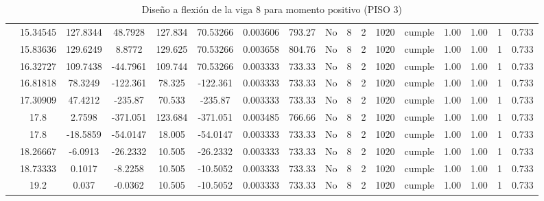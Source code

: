 \begin{table}[H]
{\begin{tabular}{|c|c|c|c|c|c|c|c|c|c|c|c|c|c|c|c|c|}
\cline{2-17}        & 15.34545 & 127.8344 & 48.7928 & 127.834 & 70.53266 & 0.003606 & 793.27 & No  & 8   & 2   & 1020 & \cellcolor[rgb]{ .776,  .937,  .808}cumple & 1.00 & 1.00 & 1   & 0.733 \bigstrut\\
\cline{2-17}        & 15.83636 & 129.6249 & 8.8772 & 129.625 & 70.53266 & 0.003658 & 804.76 & No  & 8   & 2   & 1020 & \cellcolor[rgb]{ .776,  .937,  .808}cumple & 1.00 & 1.00 & 1   & 0.733 \bigstrut\\
\cline{2-17}        & 16.32727 & 109.7438 & -44.7961 & 109.744 & 70.53266 & 0.003333 & 733.33 & No  & 8   & 2   & 1020 & \cellcolor[rgb]{ .776,  .937,  .808}cumple & 1.00 & 1.00 & 1   & 0.733 \bigstrut\\
\cline{2-17}        & 16.81818 & 78.3249 & -122.361 & 78.325 & -122.361 & 0.003333 & 733.33 & No  & 8   & 2   & 1020 & \cellcolor[rgb]{ .776,  .937,  .808}cumple & 1.00 & 1.00 & 1   & 0.733 \bigstrut\\
\cline{2-17}        & 17.30909 & 47.4212 & -235.87 & 70.533 & -235.87 & 0.003333 & 733.33 & No  & 8   & 2   & 1020 & \cellcolor[rgb]{ .776,  .937,  .808}cumple & 1.00 & 1.00 & 1   & 0.733 \bigstrut\\
\cline{2-17}        & \cellcolor[rgb]{ .851,  .882,  .949}17.8 & 2.7598 & -371.051 & 123.684 & -371.051 & 0.003485 & 766.66 & No  & 8   & 2   & 1020 & \cellcolor[rgb]{ .776,  .937,  .808}cumple & 1.00 & 1.00 & 1   & 0.733 \bigstrut\\
\cline{2-17}        & \cellcolor[rgb]{ .851,  .882,  .949}17.8 & -18.5859 & -54.0147 & 18.005 & -54.0147 & 0.003333 & 733.33 & No  & 8   & 2   & 1020 & \cellcolor[rgb]{ .776,  .937,  .808}cumple & 1.00 & 1.00 & 1   & 0.733 \bigstrut\\
\cline{2-17}        & 18.26667 & -6.0913 & -26.2332 & 10.505 & -26.2332 & 0.003333 & 733.33 & No  & 8   & 2   & 1020 & \cellcolor[rgb]{ .776,  .937,  .808}cumple & 1.00 & 1.00 & 1   & 0.733 \bigstrut\\
\cline{2-17}        & 18.73333 & 0.1017 & -8.2258 & 10.505 & -10.5052 & 0.003333 & 733.33 & No  & 8   & 2   & 1020 & \cellcolor[rgb]{ .776,  .937,  .808}cumple & 1.00 & 1.00 & 1   & 0.733 \bigstrut\\
\cline{2-17}        & 19.2 & 0.037 & -0.0362 & 10.505 & -10.5052 & 0.003333 & 733.33 & No  & 8   & 2   & 1020 & \cellcolor[rgb]{ .776,  .937,  .808}cumple & 1.00 & 1.00 & 1   & 0.733 \bigstrut\\
    \hline
    \end{tabular}%

  }%
    \caption{Diseño a flexión de la viga 8 para momento positivo (PISO 3) }
  \label{tab:F VG8 P3 M+}%
\end{table}%
